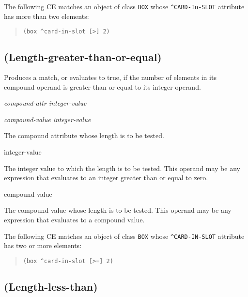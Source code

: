 \Example

The following CE matches an object of class \verb|BOX| whose
\verb|^CARD-In-SLOT| attribute has more than two elements:

\begin{quote}
\begin{verbatim}
(box ^card-in-slot [>] 2)
\end{verbatim}
\end{quote}

\subsection{\co{[>=]} (Length-greater-than-or-equal)}

Produces a match, or evaluates to true, if the number of elements in
its compound operand is greater than or equal to its integer operand.

\Format

\ct\it{compound-attr} \co{[>=]} \it{integer-value}

\it{compound-value} \co{[>=]} \it{integer-value}

\begin{operands}
\item[\ct{compound-attr}]

  The compound attribute whose length is to be tested.

\item[integer-value]

  The integer value to which the length is to be tested. This operand
  may be any expression that evaluates to an integer greater than or
  equal to zero.

\item[compound-value]

  The compound value whose length is to be tested. This operand may be
  any expression that evaluates to a compound value.
\end{operands}

\Example

The following CE matches an object of class \verb|BOX| whose
\verb|^CARD-IN-SLOT| attribute has two or more elements:

\begin{quote}
\begin{verbatim}
(box ^card-in-slot [>=] 2)
\end{verbatim}
\end{quote}

\subsection{\co{[<]} (Length-less-than)}

